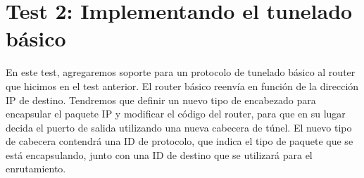 \section{Test 2: Implementando el tunelado básico}

En este test, agregaremos soporte para un protocolo de tunelado básico al router que hicimos en el test anterior. El router básico reenvía en función de la dirección IP de destino. Tendremos que definir un nuevo tipo de encabezado para encapsular el paquete IP y modificar el código del router, para que en su lugar decida el puerto de salida utilizando una nueva cabecera de túnel.\newline
\newline
El nuevo tipo de cabecera contendrá una ID de protocolo, que indica el tipo de paquete que se está encapsulando, junto con una ID de destino que se utilizará para el enrutamiento.

